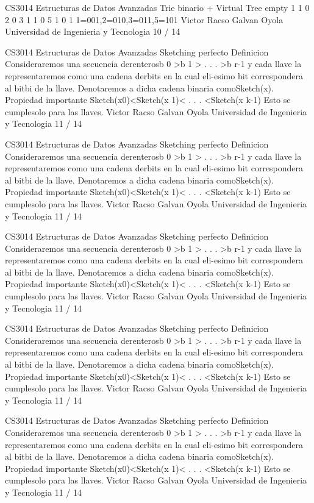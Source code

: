 \begin{description}[leftmargin=!,labelwidth=4.2em,style=nextline]
\item[Pag. 34] CS3014 Estructuras de Datos Avanzadas Trie binario + Virtual Tree empty 1 1 0 2 0 3 1 1 0 5 1 0 1 1=001,2=010,3=011,5=101 Victor Racso Galvan Oyola Universidad de Ingenieria y Tecnologia 10 / 14
\item[Pag. 35] CS3014 Estructuras de Datos Avanzadas Sketching perfecto Definicion Consideraremos una secuencia derenterosb 0 >b 1 > . . . >b r-1 y cada llave la representaremos como una cadena derbits en la cual eli-esimo bit correspondera al bitbi de la llave. Denotaremos a dicha cadena binaria comoSketch(x). Propiedad importante Sketch(x0)<Sketch(x 1)< . . . <Sketch(x k-1) Esto se cumplesolo para las llaves. Victor Racso Galvan Oyola Universidad de Ingenieria y Tecnologia 11 / 14
\item[Pag. 36] CS3014 Estructuras de Datos Avanzadas Sketching perfecto Definicion Consideraremos una secuencia derenterosb 0 >b 1 > . . . >b r-1 y cada llave la representaremos como una cadena derbits en la cual eli-esimo bit correspondera al bitbi de la llave. Denotaremos a dicha cadena binaria comoSketch(x). Propiedad importante Sketch(x0)<Sketch(x 1)< . . . <Sketch(x k-1) Esto se cumplesolo para las llaves. Victor Racso Galvan Oyola Universidad de Ingenieria y Tecnologia 11 / 14
\item[Pag. 37] CS3014 Estructuras de Datos Avanzadas Sketching perfecto Definicion Consideraremos una secuencia derenterosb 0 >b 1 > . . . >b r-1 y cada llave la representaremos como una cadena derbits en la cual eli-esimo bit correspondera al bitbi de la llave. Denotaremos a dicha cadena binaria comoSketch(x). Propiedad importante Sketch(x0)<Sketch(x 1)< . . . <Sketch(x k-1) Esto se cumplesolo para las llaves. Victor Racso Galvan Oyola Universidad de Ingenieria y Tecnologia 11 / 14
\item[Pag. 38] CS3014 Estructuras de Datos Avanzadas Sketching perfecto Definicion Consideraremos una secuencia derenterosb 0 >b 1 > . . . >b r-1 y cada llave la representaremos como una cadena derbits en la cual eli-esimo bit correspondera al bitbi de la llave. Denotaremos a dicha cadena binaria comoSketch(x). Propiedad importante Sketch(x0)<Sketch(x 1)< . . . <Sketch(x k-1) Esto se cumplesolo para las llaves. Victor Racso Galvan Oyola Universidad de Ingenieria y Tecnologia 11 / 14
\item[Pag. 39] CS3014 Estructuras de Datos Avanzadas Sketching perfecto Definicion Consideraremos una secuencia derenterosb 0 >b 1 > . . . >b r-1 y cada llave la representaremos como una cadena derbits en la cual eli-esimo bit correspondera al bitbi de la llave. Denotaremos a dicha cadena binaria comoSketch(x). Propiedad importante Sketch(x0)<Sketch(x 1)< . . . <Sketch(x k-1) Esto se cumplesolo para las llaves. Victor Racso Galvan Oyola Universidad de Ingenieria y Tecnologia 11 / 14

\end{description}
